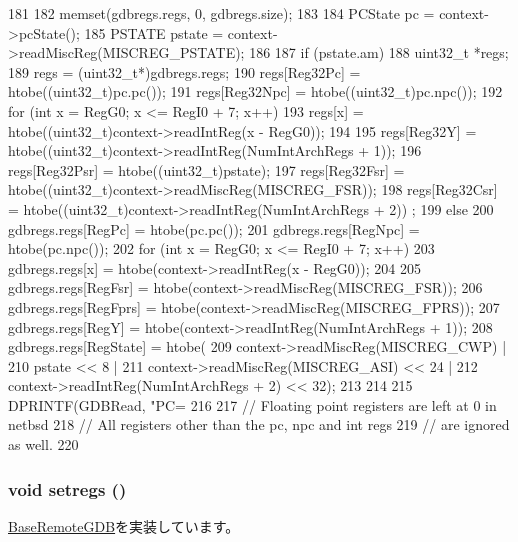 \begin{DoxyCode}
181 {
182     memset(gdbregs.regs, 0, gdbregs.size);
183 
184     PCState pc = context->pcState();
185     PSTATE pstate = context->readMiscReg(MISCREG_PSTATE);
186 
187     if (pstate.am) {
188         uint32_t *regs;
189         regs = (uint32_t*)gdbregs.regs;
190         regs[Reg32Pc] = htobe((uint32_t)pc.pc());
191         regs[Reg32Npc] = htobe((uint32_t)pc.npc());
192         for (int x = RegG0; x <= RegI0 + 7; x++)
193             regs[x] = htobe((uint32_t)context->readIntReg(x - RegG0));
194 
195         regs[Reg32Y] = htobe((uint32_t)context->readIntReg(NumIntArchRegs + 1));
196         regs[Reg32Psr] = htobe((uint32_t)pstate);
197         regs[Reg32Fsr] = htobe((uint32_t)context->readMiscReg(MISCREG_FSR));
198         regs[Reg32Csr] = htobe((uint32_t)context->readIntReg(NumIntArchRegs + 2))
      ;
199     } else {
200         gdbregs.regs[RegPc] = htobe(pc.pc());
201         gdbregs.regs[RegNpc] = htobe(pc.npc());
202         for (int x = RegG0; x <= RegI0 + 7; x++)
203             gdbregs.regs[x] = htobe(context->readIntReg(x - RegG0));
204 
205         gdbregs.regs[RegFsr] = htobe(context->readMiscReg(MISCREG_FSR));
206         gdbregs.regs[RegFprs] = htobe(context->readMiscReg(MISCREG_FPRS));
207         gdbregs.regs[RegY] = htobe(context->readIntReg(NumIntArchRegs + 1));
208         gdbregs.regs[RegState] = htobe(
209             context->readMiscReg(MISCREG_CWP) |
210             pstate << 8 |
211             context->readMiscReg(MISCREG_ASI) << 24 |
212             context->readIntReg(NumIntArchRegs + 2) << 32);
213     }
214 
215     DPRINTF(GDBRead, "PC=%
216 
217     // Floating point registers are left at 0 in netbsd
218     // All registers other than the pc, npc and int regs
219     // are ignored as well.
220 }
\end{DoxyCode}
\hypertarget{classSparcISA_1_1RemoteGDB_a2051121b6bc93c8ca3856bbeeca7bdc1}{
\subsubsection[{setregs}]{\setlength{\rightskip}{0pt plus 5cm}void setregs ()}}
\label{classSparcISA_1_1RemoteGDB_a2051121b6bc93c8ca3856bbeeca7bdc1}


\hyperlink{classBaseRemoteGDB_a6b0b51dc196f12756cc0ec49a3ae6a6a}{BaseRemoteGDB}を実装しています。


